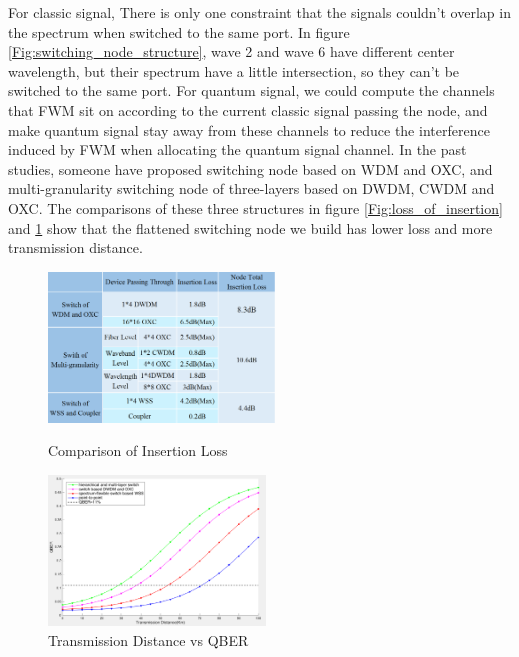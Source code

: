 \documentclass[letterpaper,10pt]{article}
\begin{document}
For classic signal, There is only one constraint that the signals couldn't overlap in the spectrum when switched to the same port. In figure \ref{Fig:switching_node_structure}, wave 2 and wave 6 have different center wavelength, but their spectrum have a little intersection, so they can't be switched to the same port. For quantum signal, we could compute the channels that FWM sit on according to the current classic signal passing the node, and make quantum signal stay away from these channels to reduce the interference induced by FWM when allocating the quantum signal channel. In the past studies, someone have proposed switching node based on WDM and OXC, and multi-granularity switching node of three-layers based on DWDM, CWDM and OXC. The comparisons of these three structures in figure \ref{Fig:loss_of_insertion} and \ref{Fig:distance_vs_qber} show that the flattened switching node we build has lower loss and more transmission distance.

\begin{figure}[!htb]
   \begin{minipage}{0.48\textwidth}
     \centering
     \includegraphics[height= 4cm,width=.9\linewidth]{comparison_of_three_kind_of_nodes_prety}
     \caption{Comparison of Insertion Loss} 
     \label{Fig:loss_of_insertion}
   \end{minipage}\hfill
   \begin{minipage}{0.48\textwidth}
     \centering
     \includegraphics[height= 4cm,width=.9\linewidth]{distance_of_transmission_with_label}
     \caption{Transmission Distance vs QBER} 
     \label{Fig:distance_vs_qber}
   \end{minipage}
\end{figure}
\end{document}
